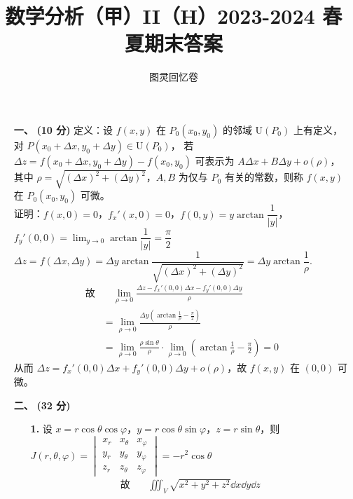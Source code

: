 \documentclass{ctexart}
\title{\vspace{-4em}\textbf{数学分析（甲）II（H）2023-2024 春夏期末答案}}
\author{图灵回忆卷}
\begin{document}
\maketitle

\begin{enumerate}
    \item[\textbf{一、}] \textbf{(10 分)} 定义：设 $f(x,y)$ 在 $P_0(x_0,y_0)$ 的邻域 $\mathrm{U}(P_0)$ 上有定义，对 $P(x_0+\Delta x, y_0+\Delta y)\in\mathrm{U}(P_0)$，
    若 $\Delta z = f(x_0+\Delta x, y_0+\Delta y)-f(x_0, y_0)$ 可表示为 
    $A\Delta x+B\Delta y+o(\rho)$，\\
    其中 $\rho=\sqrt{(\Delta x)^2+(\Delta y)^2}$，$A,B$ 为仅与 $P_0$ 有关的常数，则称 $f(x,y)$ 在 $P_0(x_0,y_0)$ 可微。 \\
    证明：$f(x,0)=0$，$f_x'(x,0)=0$，$f(0,y)=y\arctan{\dfrac{1}{\left\vert y \right\vert}}$，$f_y'(0,0)=\lim_{y \to 0}\arctan{\dfrac{1}{\left\vert y \right\vert }}=\dfrac{\pi}{2}$ \\
    $\Delta z=f(\Delta x,\Delta y)=\Delta y\arctan{\dfrac{1}{\sqrt{(\Delta x)^2+(\Delta y)^2}}}=\Delta y\arctan{\dfrac{1}{\rho}}.$
    \begin{align*} 
    \text{故}& \quad\lim_{\rho \to 0}\frac{\Delta z-f_x'(0,0)\Delta x-f_y'(0,0)\Delta y}{\rho} \\
    & =\lim_{\rho \to 0}\frac{\Delta y(\arctan{\frac{1}{\rho}-\frac{\pi}{2}})}{\rho} \\
    & =\lim_{\rho \to 0}\frac{\rho\sin\theta}{\rho}\cdot\lim_{\rho \to 0}(\arctan{\frac{1}{\rho}}-\frac{\pi}{2})=0
    \end{align*}
    从而 $\Delta z=f_x'(0,0)\Delta x+f_y'(0,0)\Delta y+o(\rho)$，故 $f(x,y)$ 在 $(0,0)$ 可微。
    \item[\textbf{二、}] \textbf{(32 分)}
    \begin{enumerate}
        \item[\textbf{1.}] 设 $x=r\cos\theta\cos\varphi$，$y=r\cos\theta\sin\varphi$，$z=r\sin\theta$，则 \\
        $J(r,\theta,\varphi)=\begin{vmatrix}
        x_r & x_{\theta} & x_{\varphi} \\
        y_r & y_{\theta} & y_{\varphi} \\
        z_r & z_{\theta} & z_{\varphi}
        \end{vmatrix}=-r^2\cos\theta$
        \begin{align*}
        \text{故} & \quad\iiint_{V}\sqrt{x^2+y^2+z^2}\dd{x}\dd{y}\dd{z} \\

\end{align*}
\end{enumerate}
\end{enumerate}
\end{document}
